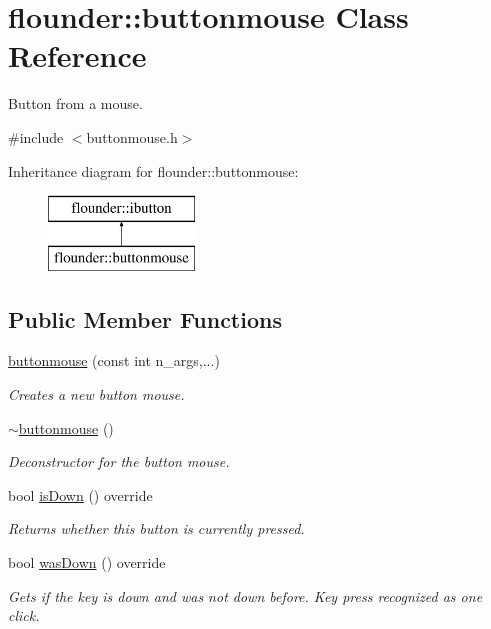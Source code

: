 \hypertarget{classflounder_1_1buttonmouse}{}\section{flounder\+:\+:buttonmouse Class Reference}
\label{classflounder_1_1buttonmouse}


Button from a mouse.  




{\ttfamily \#include $<$buttonmouse.\+h$>$}

Inheritance diagram for flounder\+:\+:buttonmouse\+:\begin{figure}[H]
\begin{center}
\leavevmode
\includegraphics[height=2.000000cm]{classflounder_1_1buttonmouse}
\end{center}
\end{figure}
\subsection*{Public Member Functions}
\begin{DoxyCompactItemize}
\item 
\hyperlink{classflounder_1_1buttonmouse_a6721eb42c25bc50c2a4db56ca27c4cda}{buttonmouse} (const int n\+\_\+args,...)
\begin{DoxyCompactList}\small\item\em Creates a new button mouse. \end{DoxyCompactList}\item 
\hyperlink{classflounder_1_1buttonmouse_aa967f7f977040b0f4a58dc10d4414e75}{$\sim$buttonmouse} ()
\begin{DoxyCompactList}\small\item\em Deconstructor for the button mouse. \end{DoxyCompactList}\item 
bool \hyperlink{classflounder_1_1buttonmouse_ab4d7ecd54f144f03886b5ef467666be1}{is\+Down} () override
\begin{DoxyCompactList}\small\item\em Returns whether this button is currently pressed. \end{DoxyCompactList}\item 
bool \hyperlink{classflounder_1_1buttonmouse_a7dad01481ebb01755db054a0acbc8159}{was\+Down} () override
\begin{DoxyCompactList}\small\item\em Gets if the key is down and was not down before. Key press recognized as one click. \end{DoxyCompactList}\end{DoxyCompactItemize}
